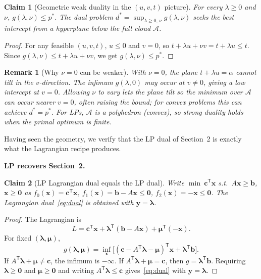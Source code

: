 \documentclass[11pt,a4paper]{article}
\newtheorem{claim}{Claim}
\newtheorem{remark}[theorem]{Remark}
\begin{document}
\begin{claim}[Geometric weak duality in the \texorpdfstring{$(u,v,t)$}{(u,v,t)} picture]
For every $\lambda\ge 0$ and $\nu$, $g(\lambda,\nu)\le p^*$.
The dual problem $d^*=\sup_{\lambda\ge 0,\,\nu} g(\lambda,\nu)$ seeks the best intercept from a hyperplane below the full cloud $\mathcal{A}$.
\end{claim}

\begin{proof}
For any feasible $(u,v,t)$, $u\le 0$ and $v=0$, so $t+\lambda u+\nu v=t+\lambda u\le t$.
Since $g(\lambda,\nu)\le t+\lambda u+\nu v$, we get $g(\lambda,\nu)\le p^*$.
\end{proof}

\begin{remark}[Why $\nu=0$ can be weaker]
With $\nu=0$, the plane $t+\lambda u=\alpha$ cannot tilt in the $v$-direction.
The infimum $g(\lambda,0)$ may occur at $v\neq 0$, giving a low intercept at $v=0$.
Allowing $\nu$ to vary lets the plane tilt so the minimum over $\mathcal{A}$ can occur nearer $v=0$,
often raising the bound; for convex problems this can achieve $d^*=p^*$.
For LPs, $\mathcal{A}$ is a polyhedron (convex), so strong duality holds when the primal optimum is finite.
\end{remark}

Having seen the geometry, we verify that the LP dual of Section~2 is exactly what the Lagrangian recipe produces.

\textbf{LP recovers Section~2.}

\begin{claim}[LP Lagrangian dual equals the LP dual]
Write $\min\ \mathbf{c}^{\mathsf T}\mathbf{x}$ s.t.\ $A\mathbf{x}\ge\mathbf{b}$, $\mathbf{x}\ge\mathbf{0}$ as
$f_0(\mathbf{x})=\mathbf{c}^{\mathsf T}\mathbf{x}$,
$f_1(\mathbf{x})=\mathbf{b}-A\mathbf{x}\le\mathbf{0}$,
$f_2(\mathbf{x})=-\mathbf{x}\le\mathbf{0}$.
The Lagrangian dual~\eqref{eq:dual} is obtained with $\mathbf{y}=\boldsymbol{\lambda}$.
\end{claim}

\begin{proof}
The Lagrangian is
\[
  L=\mathbf{c}^{\mathsf T}\mathbf{x}+\boldsymbol{\lambda}^{\mathsf T}(\mathbf{b}-A\mathbf{x})
  +\boldsymbol{\mu}^{\mathsf T}(-\mathbf{x}).
\]
For fixed $(\boldsymbol{\lambda},\boldsymbol{\mu})$,
\[
  g(\boldsymbol{\lambda},\boldsymbol{\mu})
  = \inf_{\mathbf{x}}\bigl[(\mathbf{c}-A^{\mathsf T}\boldsymbol{\lambda}-\boldsymbol{\mu})^{\mathsf T}\mathbf{x}
  +\boldsymbol{\lambda}^{\mathsf T}\mathbf{b}\bigr].
\]
If $A^{\mathsf T}\boldsymbol{\lambda}+\boldsymbol{\mu}\neq\mathbf{c}$, the infimum is $-\infty$.
If $A^{\mathsf T}\boldsymbol{\lambda}+\boldsymbol{\mu}=\mathbf{c}$, then $g=\boldsymbol{\lambda}^{\mathsf T}\mathbf{b}$.
Requiring $\boldsymbol{\lambda}\ge\mathbf{0}$ and $\boldsymbol{\mu}\ge\mathbf{0}$ and writing
$A^{\mathsf T}\boldsymbol{\lambda}\le\mathbf{c}$ gives~\eqref{eq:dual} with $\mathbf{y}=\boldsymbol{\lambda}$.
\end{proof}
\end{document}
